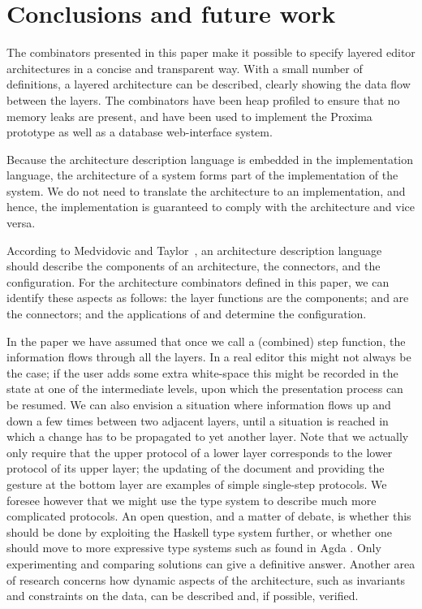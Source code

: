 \documentclass[preprint,natbib]{sigplanconf}
\begin{document}
%																
%																
%																
\section{Conclusions and future work} \label{sect:conclusions}

The combinators presented in this paper make it possible to specify layered editor architectures in a concise and transparent way. With a small number of definitions, a layered architecture can be described, clearly showing the data flow between the layers. The combinators have been heap profiled to ensure that no memory leaks are present, and have been used to implement the Proxima prototype as well as a database web-interface system.

Because the architecture description language is embedded in the implementation language, the architecture of a system forms part of the implementation of the system. We do not need to translate the architecture to an implementation, and hence, the implementation is guaranteed to comply with the architecture and vice versa.

According to Medvidovic and Taylor~\cite{medvidovic00ADLs}, an architecture description language should describe the components of an architecture, the connectors, and the configuration. For the architecture combinators defined in this paper, we can identify these aspects as follows: the layer functions are the components;  and  are the connectors; and the applications of  and  determine the configuration.

In the paper we have assumed that once we call a (combined) step function, the information flows through all the layers. In a real editor this might not always be the case; if the user adds some extra white-space this might be recorded in the state at one of the intermediate levels, upon which the presentation process can be resumed. We can also envision a situation where information flows up and down a few times between two adjacent layers, until a situation is reached in which a change has to be propagated to yet another layer. Note that we actually only require that the upper protocol of a lower layer corresponds to the lower protocol of its upper layer; the updating of the document and providing the gesture at the bottom layer are examples of simple single-step protocols. We foresee however that we might use the type system to describe much more complicated protocols. An open question, and a matter of debate, is whether this should be done by exploiting the Haskell type system further, or whether one should move to more expressive type systems such as found in Agda \cite{norell:thesis}. Only experimenting and comparing solutions can give a definitive answer. Another area of research concerns how dynamic aspects of the architecture, such as invariants and constraints on the data, can be described and, if possible, verified.
\end{document}
